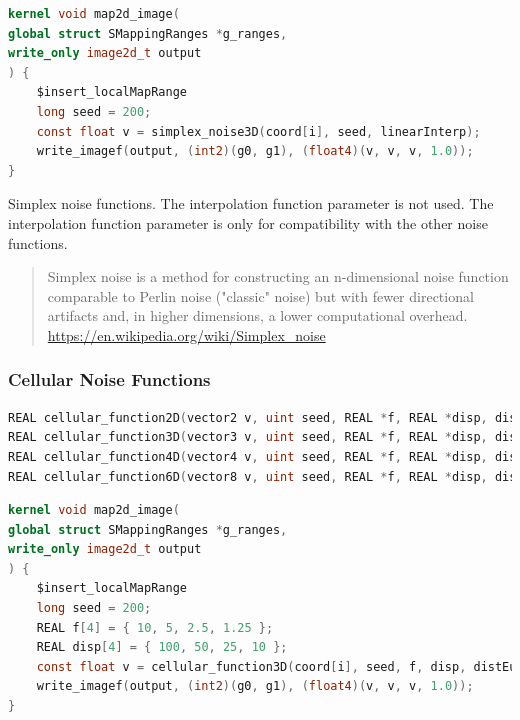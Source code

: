 \begin{lstlisting}[caption={Example for simplex noise functions},label={lst:simplex_noise_example},language=OpenCL]
kernel void map2d_image(
global struct SMappingRanges *g_ranges,
write_only image2d_t output
) {
    $insert_localMapRange
    long seed = 200;
    const float v = simplex_noise3D(coord[i], seed, linearInterp);
    write_imagef(output, (int2)(g0, g1), (float4)(v, v, v, 1.0));
}
\end{lstlisting}

Simplex noise functions. The interpolation function parameter is not used.
The interpolation function parameter is only for compatibility with
the other noise functions.

\begin{quote}
Simplex noise is a method for constructing an n-dimensional noise function
comparable to Perlin noise ("classic" noise) but with fewer directional
artifacts and, in higher dimensions, a lower computational overhead.
\url{https://en.wikipedia.org/wiki/Simplex_noise}
\end{quote}

\subsubsection{Cellular Noise Functions}

\begin{lstlisting}[caption={Definition of cellular noise functions},label={lst:cellular_noise_definition},language=OpenCL]
REAL cellular_function2D(vector2 v, uint seed, REAL *f, REAL *disp, dist_func2 distance);
REAL cellular_function3D(vector3 v, uint seed, REAL *f, REAL *disp, dist_func3 distance);
REAL cellular_function4D(vector4 v, uint seed, REAL *f, REAL *disp, dist_func4 distance);
REAL cellular_function6D(vector8 v, uint seed, REAL *f, REAL *disp, dist_func6 distance);
\end{lstlisting}

\begin{lstlisting}[caption={Example for cellular noise functions},label={lst:cellular_noise_example},language=OpenCL]
kernel void map2d_image(
global struct SMappingRanges *g_ranges,
write_only image2d_t output
) {
    $insert_localMapRange
    long seed = 200;
    REAL f[4] = { 10, 5, 2.5, 1.25 };
    REAL disp[4] = { 100, 50, 25, 10 };
    const float v = cellular_function3D(coord[i], seed, f, disp, distEuclid3);
    write_imagef(output, (int2)(g0, g1), (float4)(v, v, v, 1.0));
}
\end{lstlisting}

